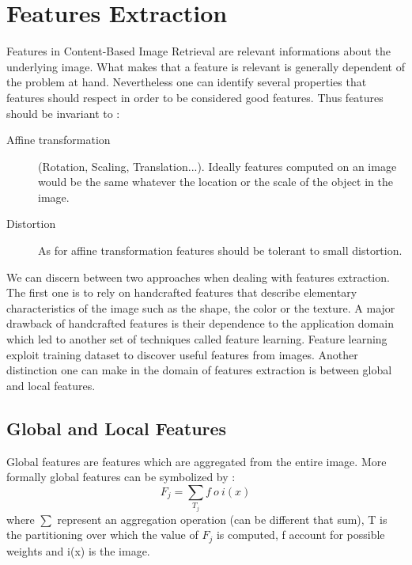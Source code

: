\chapter{Features Extraction}

  Features in Content-Based Image Retrieval are relevant informations about the underlying image. What makes that a feature is relevant is generally dependent of the problem at hand. Nevertheless one can identify several properties that features should respect in order to be considered good features. Thus features should be invariant to :

  \begin{description}

        \item[Affine transformation] (Rotation, Scaling, Translation...). Ideally features computed on an image would be the same whatever the location or the scale of the object in the image.

        \item[Distortion] As for affine transformation features should be tolerant to small distortion.


    \end{description}

    We can discern between two approaches when dealing with features extraction. The first one is to rely on handcrafted features that describe elementary characteristics of the image such as the shape, the color or the texture. A major drawback of handcrafted features is their dependence to the application domain which led to another set of techniques called feature learning. Feature learning exploit training dataset to discover useful features from images. Another distinction one can make in the domain of features extraction is between global and local features.

  \section{Global and Local Features}

  Global features are features which are aggregated from the entire image. More formally global features can be symbolized by :
  \[ F_j = \sum_{T_j} f \ o \ i(x) \] where \( \sum \) represent an aggregation operation (can be different that sum), T is the partitioning over which the value of \( F_j \) is computed, f account for possible weights and i(x) is the image.

